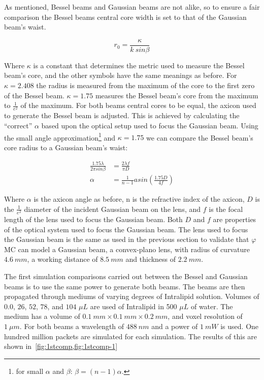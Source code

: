 As mentioned, Bessel beams and Gaussian beams are not alike, so to ensure a fair comparison the Bessel beams central core width is set to that of the Gaussian beam's waist.

\begin{equation}
r_0=\frac{\kappa}{k\ sin\beta}  
\end{equation}

Where $\kappa$ is a constant that determines the metric used to measure the Bessel beam's core, and the other symbols have the same meanings as before.
For $\kappa=2.408$ the radius is measured from the maximum of the core to the first zero of the Bessel beam.
$\kappa=1.75$ measures the Bessel beam's core from the maximum to $\tfrac{1}{e^2}$ of the maximum.
For both beams central cores to be equal, the axicon used to generate the Bessel beam is adjusted.
This is achieved by calculating the ``correct'' $\alpha$ based upon the optical setup used to focus the Gaussian beam. 
Using the small angle approximation\footnote{for small $\alpha$ and $\beta$: $\beta=(n-1)\alpha$.} and $\kappa=1.75$ we can compare the Bessel beam's core radius to a Gaussian beam's waist:

\begin{align}
\frac{1.75\lambda}{2\pi sin\beta}&=\frac{2\lambda f}{\pi D} \\
\alpha &= \frac{1}{n-1}asin\left(\frac{1.75 D}{4 f}\right)
\end{align}

Where $\alpha$ is the axicon angle as before, n is the refractive index of the axicon, $D$ is the $\tfrac{1}{e^2}$ diameter of the incident Gaussian beam on the lens, and $f$ is the focal length of the lens used to focus the Gaussian beam.
Both $D$ and $f$ are properties of the optical system used to focus the Gaussian beam.
The lens used to focus the Gaussian beam is the same as used in the previous section to validate that $\varphi$MC can model a Gaussian beam, a convex-plano lens, with radius of curvature $4.6~mm$, a working distance of $8.5~mm$ and thickness of $2.2~mm$.

\medskip

The first simulation comparisons carried out between the Bessel and Gaussian beams is to use the same power to generate both beams.
The beams are then propagated through mediums of varying degrees of Intralipid solution.
Volumes of $0.0$, $26$, $52$, $78$, and $104$ $\mu L$ are used of Intralipid in 500 $\mu L$ of water.
The medium has a volume of $0.1~mm \times 0.1~mm \times 0.2~mm$, and voxel resolution of $1~\mu m$.
For both beams a wavelength of $488~nm$ and a power of $1~mW$ is used.
One hundred million packets are simulated for each simulation.
The results of this are shown in~\cref{fig:1stcomp,fig:1stcomp-1}

